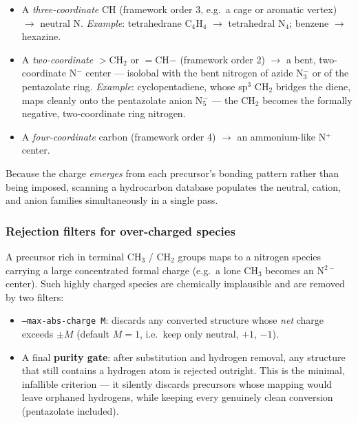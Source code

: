 \documentclass[11pt,a4paper]{article}
\begin{document}
\begin{itemize}[itemsep=2pt]
  \item A \emph{three-coordinate} CH (framework order 3, e.g.\ a cage or
    aromatic vertex) $\rightarrow$ neutral N. \emph{Example}: tetrahedrane
    C$_4$H$_4$ $\rightarrow$ tetrahedral N$_4$; benzene $\rightarrow$
    hexazine.
  \item A \emph{two-coordinate} $>$CH$_2$ or $=$CH$-$ (framework order 2)
    $\rightarrow$ a bent, two-coordinate N$^{-}$ center --- isolobal with the
    bent nitrogen of azide N$_3^{-}$ or of the pentazolate ring.
    \emph{Example}: cyclopentadiene, whose sp$^3$ CH$_2$ bridges the diene,
    maps cleanly onto the pentazolate anion N$_5^{-}$ --- the CH$_2$ becomes
    the formally negative, two-coordinate ring nitrogen.
  \item A \emph{four-coordinate} carbon (framework order 4) $\rightarrow$ an
    ammonium-like N$^{+}$ center.
\end{itemize}

Because the charge \emph{emerges} from each precursor's bonding pattern
rather than being imposed, scanning a hydrocarbon database populates the
neutral, cation, and anion families simultaneously in a single pass.

\subsubsection{Rejection filters for over-charged species}

A precursor rich in terminal CH$_3$ / CH$_2$ groups maps to a nitrogen
species carrying a large concentrated formal charge (e.g.\ a lone CH$_3$
becomes an N$^{2-}$ center). Such highly charged species are chemically
implausible and are removed by two filters:
\begin{itemize}[itemsep=2pt]
  \item \texttt{--max-abs-charge M}: discards any converted structure whose
    \emph{net} charge exceeds $\pm M$ (default $M=1$, i.e.\ keep only
    neutral, $+1$, $-1$).
  \item A final \textbf{purity gate}: after substitution and hydrogen
    removal, any structure that still contains a hydrogen atom is rejected
    outright. This is the minimal, infallible criterion --- it silently
    discards precursors whose mapping would leave orphaned hydrogens, while
    keeping every genuinely clean conversion (pentazolate included).
\end{itemize}
\end{document}
